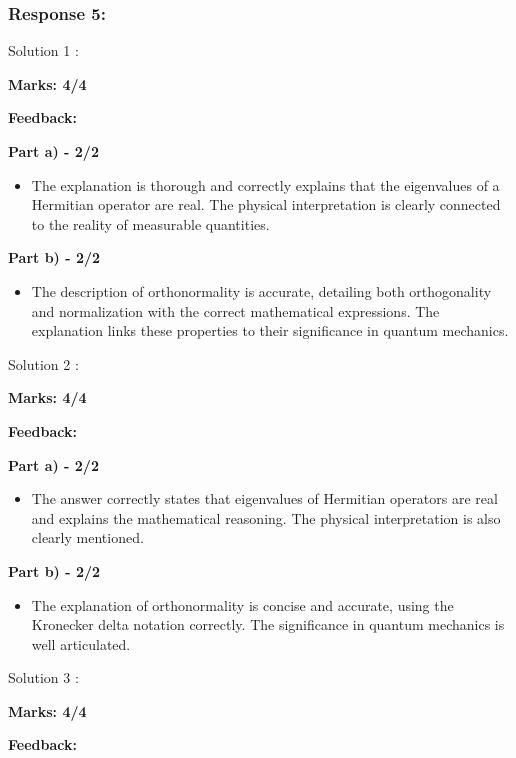 \documentclass[a4paper,11pt]{article}
\begin{document}
\subsubsection*{Response 5:}

Solution 1 :

\textbf{Marks: 4/4}

\textbf{Feedback:}

\textbf{Part a) - 2/2}

\begin{itemize}
    \item The explanation is thorough and correctly explains that the eigenvalues of a Hermitian operator are real. The physical interpretation is clearly connected to the reality of measurable quantities.
\end{itemize}

\textbf{Part b) - 2/2}

\begin{itemize}
    \item The description of orthonormality is accurate, detailing both orthogonality and normalization with the correct mathematical expressions. The explanation links these properties to their significance in quantum mechanics.
\end{itemize}



Solution 2 :

\textbf{Marks: 4/4}

\textbf{Feedback:}

\textbf{Part a) - 2/2}

\begin{itemize}
    \item The answer correctly states that eigenvalues of Hermitian operators are real and explains the mathematical reasoning. The physical interpretation is also clearly mentioned.
\end{itemize}

\textbf{Part b) - 2/2}

\begin{itemize}
    \item The explanation of orthonormality is concise and accurate, using the Kronecker delta notation correctly. The significance in quantum mechanics is well articulated.
\end{itemize}



Solution 3 :

\textbf{Marks: 4/4}

\textbf{Feedback:}
\end{document}
